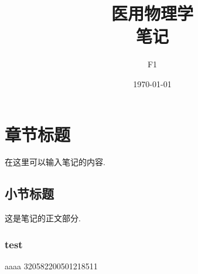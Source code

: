 \documentclass[12pt, a4paper, oneside]{ctexbook}
\title{{\Huge{\textbf{医用物理学}}}\\笔记}
\author{F1}
\date{\today}
\begin{document}
\maketitle

\setcounter{page}{1}



{}
\setcounter{page}{1}
\tableofcontents
\newpage
\setcounter{page}{1}

\chapter{章节标题}

在这里可以输入笔记的内容. 

\section{小节标题}

这是笔记的正文部分. 
\subsection{test}
aaaa
320582200501218511
\end{document}

